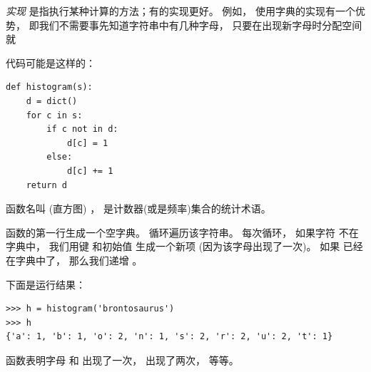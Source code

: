 {\em 实现} 是指执行某种计算的方法；有的实现更好。
例如， 使用字典的实现有一个优势， 即我们不需要事先知道字符串中有几种字母，
只要在出现新字母时分配空间就


代码可能是这样的：

\begin{lstlisting}
def histogram(s):
    d = dict()
    for c in s:
        if c not in d:
            d[c] = 1
        else:
            d[c] += 1
    return d
\end{lstlisting}

%

函数名叫  (直方图) ， 是计数器(或是频率)集合的统计术语。

  


函数的第一行生成一个空字典。    循环遍历该字符串。
每次循环， 如果字符  不在字典中，  我们用键  和初始值  生成一个新项 (因为该字母出现了一次)。   如果  已经在字典中了， 那么我们递增  。



下面是运行结果：

\begin{lstlisting}
>>> h = histogram('brontosaurus')
>>> h
{'a': 1, 'b': 1, 'o': 2, 'n': 1, 's': 2, 'r': 2, 'u': 2, 't': 1}
\end{lstlisting}

%

 函数表明字母  和  出现了一次，    出现了两次， 等等。

  


